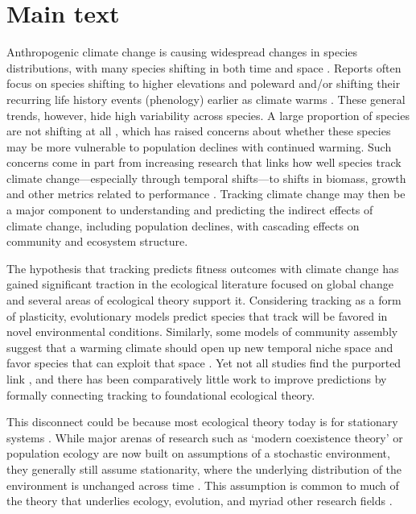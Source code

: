 \documentclass[11pt,letterpaper]{article}
\begin{document}
\newpage
\section{Main text}
Anthropogenic climate change is causing widespread changes in species distributions, with many species shifting in both time and space \citep{IPCC:2014sm}. Reports often focus on species shifting to higher elevations and poleward \citep{Chen2011} and/or shifting their recurring life history events (phenology) earlier as climate warms \citep{Wolkovich:2012n,cohen2018}. These general trends, however, hide high variability across species. A large proportion of species are not shifting at all \citep{Cook:2012pnas}, which has raised concerns about whether these species may be more vulnerable to population declines with continued warming. Such concerns come in part from increasing research that links how well species track climate change---especially through temporal shifts---to shifts in biomass, growth and other metrics related to performance \citep{Cleland:2012}. Tracking climate change may then be a major component to understanding and predicting the indirect effects of climate change, including population declines, with cascading effects on community and ecosystem structure.

The hypothesis that tracking predicts fitness outcomes with climate change has gained significant traction in the ecological literature focused on global change \citep[e.g.,][]{Cleland:2012} and several areas of ecological theory support it. Considering tracking as a form of plasticity, evolutionary models predict species that track will be favored in novel environmental conditions. Similarly, some models of community assembly suggest that a warming climate should open up new temporal niche space and favor species that can exploit that space \citep{gotelli1996,wolkovich:2010fee,Zettlemoyer2019}. Yet not all studies find the purported link \citep[e.g.,][]{block2019}, and there has been comparatively little work to improve predictions by formally connecting tracking to foundational ecological theory. %

This disconnect could be because most ecological theory today is for stationary systems \citep[e.g.,][]{Sale:1977oq,Chesson:1997dz}. While major arenas of research such as `modern coexistence theory' or population ecology are now built on assumptions of a stochastic environment, they generally still assume stationarity, where the underlying distribution of the environment is unchanged across time \citep[i.e., constant mean and variance,][]{barabas2018}. This assumption is common to much of the theory that underlies ecology, evolution, and myriad other research fields \citep[e.g.,][]{Milly:2008yu,nosenko2013}. 
\end{document}
